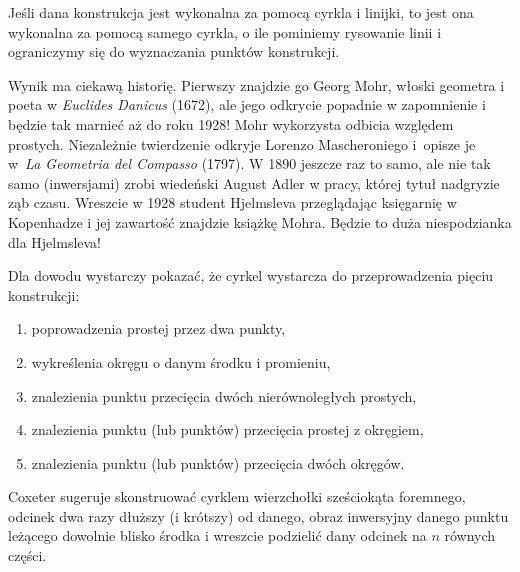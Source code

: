 %

\begin{theorem}
%
    Jeśli dana konstrukcja jest wykonalna za pomocą cyrkla i linijki, to jest ona wykonalna za pomocą samego cyrkla, o ile pominiemy rysowanie linii i ograniczymy się do wyznaczania punktów konstrukcji.
\end{theorem}

Wynik ma ciekawą historię.
Pierwszy znajdzie go Georg Mohr, włoski geometra i poeta w \emph{Euclides Danicus} (1672), ale jego odkrycie popadnie w zapomnienie i będzie tak marnieć aż do roku 1928!
Mohr wykorzysta odbicia względem prostych. %
Niezależnie twierdzenie odkryje Lorenzo Mascheroniego i~opisze je w~\emph{La Geometria del Compasso} (1797).
W 1890 jeszcze raz to samo, ale nie tak samo (inwersjami) zrobi wiedeński August Adler w pracy, której tytuł nadgryzie ząb czasu.
Wreszcie w 1928 student Hjelmsleva przeglądając księgarnię w Kopenhadze i jej zawartość znajdzie książkę Mohra.
Będzie to duża niespodzianka dla Hjelmsleva!

Dla dowodu wystarczy pokazać, że cyrkel wystarcza do przeprowadzenia pięciu konstrukcji:
\begin{enumerate}
    \item poprowadzenia prostej przez dwa punkty,
    \item wykreślenia okręgu o danym środku i promieniu,
    \item znalezienia punktu przecięcia dwóch nierównoległych prostych,
    \item znalezienia punktu (lub punktów) przecięcia prostej z okręgiem,
    \item znalezienia punktu (lub punktów) przecięcia dwóch okręgów.
\end{enumerate}

Coxeter \cite[s. 95]{coxeter_1967} sugeruje skonstruować cyrklem wierzchołki sześciokąta foremnego, odcinek dwa razy dłuższy (i krótszy) od danego, obraz inwersyjny danego punktu leżącego dowolnie blisko środka i wreszcie podzielić dany odcinek na $n$ równych części.

%